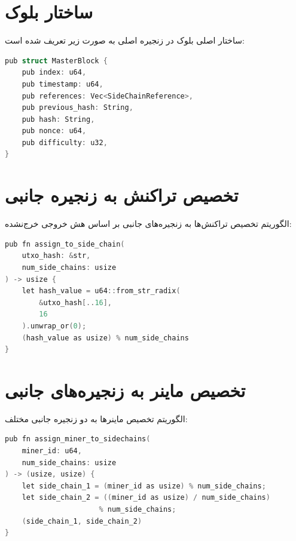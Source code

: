 \section{ساختار بلوک}

ساختار اصلی بلوک در زنجیره اصلی به صورت زیر تعریف شده است:

\singlespacing
\begin{LTR}
\begin{lstlisting}[language=C, caption={ساختار بلوک در زنجیره اصلی}, label={code:master_block}]
pub struct MasterBlock {
    pub index: u64,
    pub timestamp: u64,
    pub references: Vec<SideChainReference>,
    pub previous_hash: String,
    pub hash: String,
    pub nonce: u64,
    pub difficulty: u32,
}
\end{lstlisting}
\end{LTR}
\doublespacing

\section{تخصیص تراکنش به زنجیره جانبی}

الگوریتم تخصیص تراکنش‌ها به زنجیره‌های جانبی بر اساس هش خروجی خرج‌نشده:

\singlespacing
\begin{LTR}
\begin{lstlisting}[language=C, caption={تخصیص تراکنش به زنجیره جانبی}, label={code:tx_assignment}]
pub fn assign_to_side_chain(
    utxo_hash: &str,
    num_side_chains: usize
) -> usize {
    let hash_value = u64::from_str_radix(
        &utxo_hash[..16], 
        16
    ).unwrap_or(0);
    (hash_value as usize) % num_side_chains
}
\end{lstlisting}
\end{LTR}
\doublespacing

\section{تخصیص ماینر به زنجیره‌های جانبی}

الگوریتم تخصیص ماینرها به دو زنجیره جانبی مختلف:

\singlespacing
\begin{LTR}
\begin{lstlisting}[language=C, caption={تخصیص ماینر به زنجیره‌های جانبی}, label={code:miner_assignment}]
pub fn assign_miner_to_sidechains(
    miner_id: u64,
    num_side_chains: usize
) -> (usize, usize) {
    let side_chain_1 = (miner_id as usize) % num_side_chains;
    let side_chain_2 = ((miner_id as usize) / num_side_chains) 
                      % num_side_chains;
    (side_chain_1, side_chain_2)
}
\end{lstlisting}
\end{LTR}
\doublespacing

